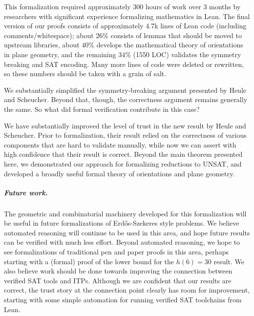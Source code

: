 This formalization required approximately 300 hours of work over 3 months
by researchers with significant experience formalizing mathematics in Lean.
The final version of our proofs consists of approximately 4.7k lines of Lean code
(including comments/whitespace);
about $26\%$ consists of lemmas that should be moved to upstream libraries,
about $40\%$ develops the mathematical theory of orientations in plane geometry,
and the remaining $34\%$ (1550 LOC) validates the symmetry breaking and SAT encoding.
Many more lines of code were deleted or rewritten,
so these numbers should be taken with a grain of salt.

We substantially simplified the symmetry-breaking argument presented by Heule and Scheucher.
Beyond that, though, the correctness argument remains generally the same.
So what did formal verification contribute in this case?

We have substantially improved the level of trust in the new result by Heule and Scheucher.
Prior to formalization,
their result relied on the correctness of various components that are hard to validate manually,
while now we can assert with high confidence that their result is correct.
Beyond the main theorem presented here,
we demonstrated our approach for formalizing reductions to UNSAT,
and developed a broadly useful formal theory of orientations and plane geometry.

\subparagraph*{Future work.}
The geometric and combinatorial machinery developed for this formalization
will be useful in future formalizations of Erd\H{o}s-Szekeres style problems.
We believe automated reasoning will continue to be used in this area,
and hope future results can be verified with much less effort.
Beyond automated reasoning,
we hope to see formalizations of traditional pen and paper proofs in this area,
perhaps starting with a (formal) proof of the lower bound for the $h(6) = 30$ result.
We also believe work should be done towards improving the connection between verified SAT tools and ITPs.
Although we are confident that our results are correct,
the trust story at the connection point clearly has room for improvement,
starting with some simple automation for running verified SAT toolchains from Lean.
